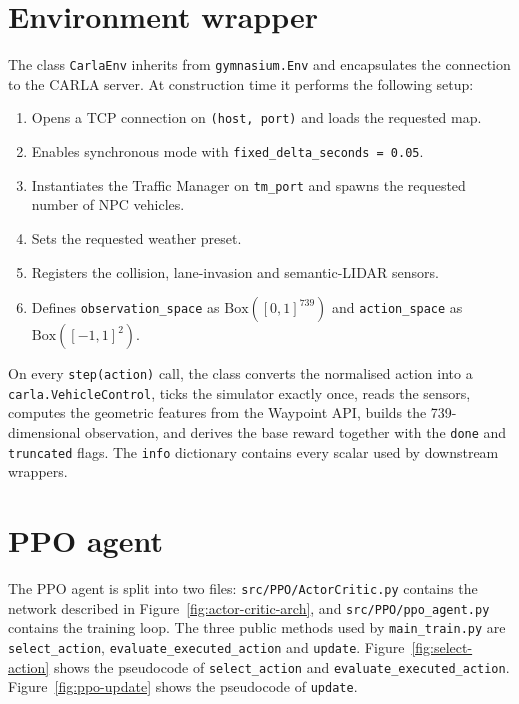 \section{Environment wrapper}\label{sec:impl-env}

The class \texttt{CarlaEnv} inherits from \texttt{gymnasium.Env} and encapsulates the connection
to the CARLA server. At construction time it performs the following setup:

\begin{enumerate}
  \item Opens a TCP connection on \texttt{(host, port)} and loads the requested map.
  \item Enables synchronous mode with \texttt{fixed\_delta\_seconds = 0.05}.
  \item Instantiates the Traffic Manager on \texttt{tm\_port} and spawns the requested number
        of NPC vehicles.
  \item Sets the requested weather preset.
  \item Registers the collision, lane-invasion and semantic-LIDAR sensors.
  \item Defines \texttt{observation\_space} as \(\text{Box}([0,1]^{739})\) and
        \texttt{action\_space} as \(\text{Box}([-1,1]^2)\).
\end{enumerate}

On every \texttt{step(action)} call, the class converts the normalised action into a
\texttt{carla.VehicleControl}, ticks the simulator exactly once, reads the sensors, computes the
geometric features from the Waypoint API, builds the 739-dimensional observation, and derives the
base reward together with the \texttt{done} and \texttt{truncated} flags. The \texttt{info}
dictionary contains every scalar used by downstream wrappers.

\section{PPO agent}\label{sec:impl-agent}

The PPO agent is split into two files: \texttt{src/PPO/ActorCritic.py} contains the network
described in Figure~\ref{fig:actor-critic-arch}, and \texttt{src/PPO/ppo\_agent.py} contains
the training loop. The three public methods used by \texttt{main\_train.py} are
\texttt{select\_action}, \texttt{evaluate\_executed\_action} and \texttt{update}.
Figure~\ref{fig:select-action} shows the pseudocode of \texttt{select\_action} and
\texttt{evaluate\_executed\_action}. Figure~\ref{fig:ppo-update} shows the pseudocode of \texttt{update}.

